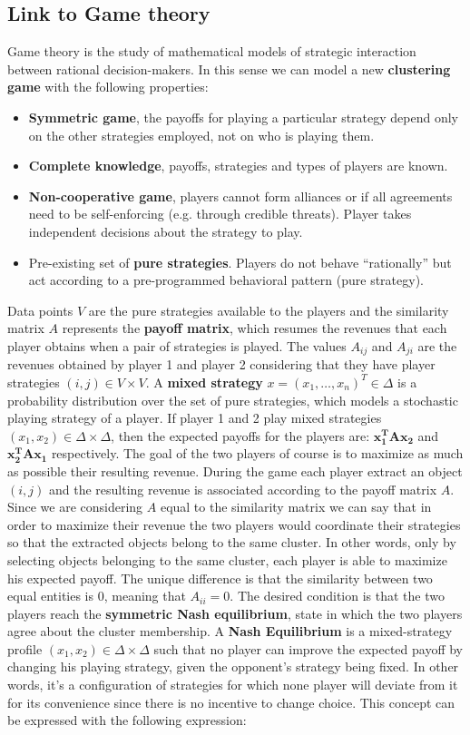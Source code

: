 \subsection{Link to Game theory}
Game theory is the study of mathematical models of strategic interaction between rational decision-makers. In this sense we can model a new \textbf{clustering game} with the following properties:
\begin{itemize}
	\item \textbf{Symmetric game}, the payoffs for playing a particular strategy depend only on the other strategies employed, not on who is playing them. 
	\item \textbf{Complete knowledge}, payoffs, strategies and types of players are known.
	\item \textbf{Non-cooperative game}, players cannot form alliances or if all agreements need to be self-enforcing (e.g. through credible threats). Player takes independent decisions about the strategy to play.
	\item Pre-existing set of \textbf{pure strategies}. Players do not behave “rationally” but act according to a pre-programmed behavioral pattern (pure strategy).
\end{itemize}
Data points $V$ are the pure strategies available to the players and the similarity matrix $A$ represents the \textbf{payoff matrix}, which resumes the revenues that each player obtains when a pair of strategies is played. The values $A_{ij}$ and $A_{ji}$ are the revenues obtained by player 1 and player 2 considering that they have player strategies $(i,j) \in V\times V$.
A \textbf{mixed strategy} $x=(x_1, \dots, x_n)^T \in \Delta$ is a probability distribution over the set of pure strategies, which models a stochastic playing strategy of a player. If player 1 and 2 play mixed strategies $(x_1, x_2) \in \Delta \times \Delta$, then the expected payoffs for the players are: $\mathbf{x_1^TAx_2}$ and $\mathbf{x_2^TAx_1}$ respectively.
The goal of the two players of course is to maximize as much as possible their resulting revenue. During the game each player extract an object $(i,j)$ and the resulting revenue is associated
according to the payoff matrix $A$. Since we are considering $A$ equal to the similarity matrix we can say that in order to maximize their revenue the two players would coordinate their strategies so that the extracted objects belong to the same cluster. In other words, only by selecting objects belonging to the same cluster, each player is able to maximize his expected payoff. The unique difference is that the similarity between two equal entities is $0$, meaning that $A_{ii} = 0$. The desired condition is that the two players reach the \textbf{symmetric Nash equilibrium}, state in which the two players agree about the cluster membership. A \textbf{Nash Equilibrium} is a mixed-strategy profile $(x_1,x_2)\in \Delta\times \Delta$ such that no player can improve the expected payoff by changing his playing strategy, given the opponent's strategy being fixed. In other words, it's a configuration of strategies for which none player will deviate from it for its convenience since there is no incentive to change choice. This concept can be expressed with the following expression:
